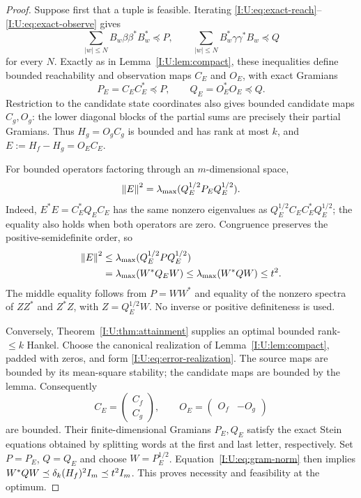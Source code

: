 \begin{proof}
Suppose first that a tuple is feasible. Iterating
\eqref{I:U:eq:exact-reach}--\eqref{I:U:eq:exact-observe} gives
\[
 \sum_{|w|\le N}B_w\beta\beta^*B_w^*\preceq P,
 \qquad
 \sum_{|w|\le N}B_w^*\gamma\gamma^*B_w\preceq Q
\]
for every $N$. Exactly as in Lemma~\ref{I:U:lem:compact}, these inequalities define bounded reachability and observation maps $C_E$ and $O_E$, with exact Gramians
\[
 P_E=C_EC_E^*\preceq P,\qquad Q_E=O_E^*O_E\preceq Q.
\]
Restriction to the candidate state coordinates also gives bounded candidate maps $C_g,O_g$: the lower diagonal blocks of the partial sums are precisely their partial Gramians. Thus $H_g=O_gC_g$ is bounded and has rank at most $k$, and
$E:=H_f-H_g=O_EC_E$.

For bounded operators factoring through an $m$-dimensional space,
\begin{equation}\label{I:U:eq:gram-norm}
 \left\lVert E\right\rVert^2=\lambda_{\max}(Q_E^{1/2}P_EQ_E^{1/2}).
\end{equation}
Indeed, $E^*E=C_E^*Q_EC_E$ has the same nonzero eigenvalues as $Q_E^{1/2}C_EC_E^*Q_E^{1/2}$; the equality also holds when both operators are zero. Congruence preserves the positive-semidefinite order, so
\begin{align*}
 \left\lVert E\right\rVert^2
 &\le\lambda_{\max}(Q_E^{1/2}P Q_E^{1/2})\\
 &=\lambda_{\max}(W^*Q_EW)
 \le\lambda_{\max}(W^*QW)\le t^2.
\end{align*}
The middle equality follows from $P=WW^*$ and equality of the nonzero spectra of $ZZ^*$ and $Z^*Z$, with $Z=Q_E^{1/2}W$. No inverse or positive definiteness is used.

Conversely, Theorem~\ref{I:U:thm:attainment} supplies an optimal bounded rank-$\le k$ Hankel. Choose the canonical realization of Lemma~\ref{I:U:lem:compact}, padded with zeros, and form \eqref{I:U:eq:error-realization}. The source maps are bounded by its mean-square stability; the candidate maps are bounded by the lemma. Consequently
\[
 C_E=\begin{pmatrix}C_f\\ C_g\end{pmatrix},\qquad
 O_E=\begin{pmatrix}O_f&-O_g\end{pmatrix}
\]
are bounded. Their finite-dimensional Gramians $P_E,Q_E$ satisfy the exact Stein equations obtained by splitting words at the first and last letter, respectively. Set $P=P_E$, $Q=Q_E$ and choose $W=P_E^{1/2}$. Equation~\eqref{I:U:eq:gram-norm} then implies
$W^*QW\preceq\delta_k(H_f)^2I_m\preceq t^2I_m$.
This proves necessity and feasibility at the optimum.
\end{proof}
